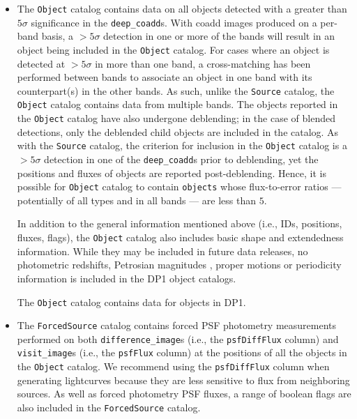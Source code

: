 \begin{itemize}
\item The \texttt{Object} catalog contains data on all objects detected with a greater than $5\sigma$ significance in the \texttt{deep\_coadd}s.
With coadd images produced on a per-band basis, a $>5\sigma$ detection in one or more of the bands will result in an object being included in the \texttt{Object} catalog.
For cases where an object is detected at $>5\sigma$ in more than one band, a cross-matching has been performed between bands to associate an object in one band with its counterpart(s) in the other bands.
As such, unlike the \texttt{Source} catalog, the \texttt{Object} catalog contains data from multiple bands. The objects reported in the \texttt{Object} catalog have also undergone deblending; in the case of blended detections, only the deblended child objects are included in the catalog.
As with the \texttt{Source} catalog, the criterion for inclusion in the \texttt{Object} catalog is a $>5\sigma$ detection in one of the \texttt{deep\_coadd}s prior to deblending, yet the positions and fluxes of objects are reported post-deblending. Hence, it is possible for \texttt{Object} catalog to contain \texttt{objects} whose flux-to-error ratios --- potentially of all types and in all bands --- are less than $5$.

In addition to the general information mentioned above (i.e., IDs, positions, fluxes, flags), the \texttt{Object} catalog also includes basic shape and extendedness information.
While they may be included in future data releases, no photometric redshifts, Petrosian magnitudes \citep{1976ApJ...209L...1P}, proper motions or periodicity information is included in the DP1 object catalogs.

The \texttt{Object} catalog contains data for \nobjects objects in DP1.


\item The \texttt{ForcedSource} catalog contains forced PSF photometry measurements performed on both \texttt{difference\_image}s (i.e., the \texttt{psfDiffFlux} column) and \texttt{visit\_image}s (i.e., the \texttt{psfFlux} column) at the positions of all the objects in the \texttt{Object} catalog.
We recommend using the \texttt{psfDiffFlux} column when generating lightcurves because they are less sensitive to flux from neighboring sources. 
As well as forced photometry PSF fluxes, a range of boolean flags are also included in the \texttt{ForcedSource} catalog. 


\end{itemize}
